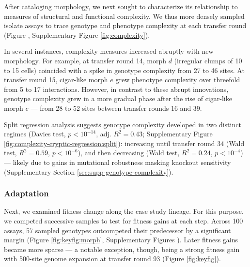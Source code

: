 After cataloging morphology, we next sought to characterize its relationship to measures of structural and functional complexity.
We thus more densely sampled isolate assays to trace genotype and phenotype complexity at each transfer round (Figure , Supplementary Figure \ref{fig:complexity}).

In several instances, complexity measures increased abruptly with new morphology.
For example, at transfer round 14, morph $d$ (irregular clumps of 10 to 15 cells) coincided with a spike in genotype complexity from 27 to 46 sites.
At transfer round 15, cigar-like morph $e$ grew phenotype complexity over threefold from 5 to 17 interactions.
However, in contrast to these abrupt innovations, genotype complexity grew in a more gradual phase after the rise of cigar-like morph $e$ --- from 28 to 52 sites between transfer rounds 16 and 39.


Split regression analysis suggests genotype complexity developed in two distinct regimes (Davies test, $p < 10^{-14}$, adj. $R^2=0.43$; Supplementary Figure \ref{fig:complexity-cryptic-regression:split}): increasing until transfer round 34 (Wald test, $R^2 = 0.59$, $p < 10^{-6}$), and then decreasing (Wald test, $R^2 = 0.24$, $p < 10^{-4}$) --- likely due to gains in mutational robustness masking knockout sensitivity (Supplementary Section \ref{sec:supp-genotype-complexity}).

\subsubsection{Adaptation}

Next, we examined fitness change along the case study lineage.
For this purpose, we competed successive samples to test for fitness gains at each step.
Across 100 assays, 57 sampled genotypes outcompeted their predecessor by a significant margin (Figure \ref{fig:keyfig:morph}, Supplementary Figures ).
Later fitness gains became more sparse --- a notable exception, though, being a strong fitness gain with 500-site genome expansion at transfer round 93 (Figure \ref{fig:keyfig}).

